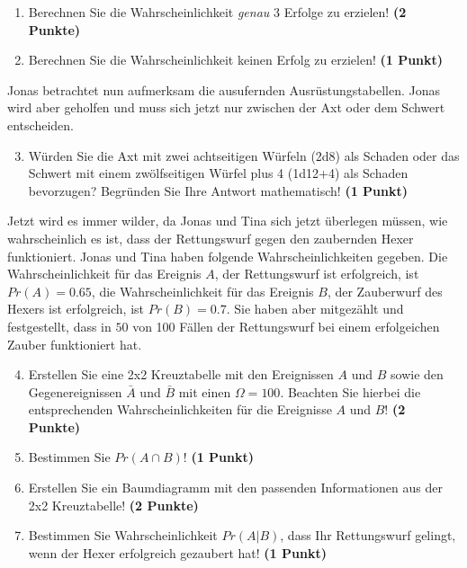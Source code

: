 \documentclass[a4paper, 9pt]{scrartcl}\usepackage[]{graphicx}\usepackage[]{xcolor}
\begin{document}
\begin{enumerate}
\item Berechnen Sie die Wahrscheinlichkeit \textit{genau} 3 Erfolge zu erzielen!  \textbf{(2 Punkte)}
\item Berechnen Sie die Wahrscheinlichkeit keinen Erfolg zu erzielen! \textbf{(1 Punkt)}
\end{enumerate}

Jonas betrachtet nun aufmerksam die ausufernden Ausrüstungstabellen. Jonas wird aber geholfen und muss sich jetzt nur zwischen der Axt oder dem Schwert entscheiden.

\begin{enumerate}
  \setcounter{enumi}{2}
\item Würden Sie die Axt mit zwei achtseitigen Würfeln (2d8) als Schaden oder das Schwert mit einem zwölfseitigen Würfel plus 4 (1d12+4) als Schaden bevorzugen? Begründen Sie Ihre Antwort mathematisch! \textbf{(1 Punkt)}
\end{enumerate}

Jetzt wird es immer wilder, da Jonas und Tina sich jetzt überlegen müssen, wie wahrscheinlich es ist, dass der Rettungswurf gegen den zaubernden Hexer funktioniert. Jonas und Tina haben folgende Wahrscheinlichkeiten gegeben. Die Wahrscheinlichkeit für das Ereignis $A$, der Rettungswurf ist erfolgreich, ist $Pr(A) = 0.65$, die Wahrscheinlichkeit für das Ereignis $B$, der Zauberwurf des Hexers ist erfolgreich, ist $Pr(B) = 0.7$. Sie haben aber mitgezählt und festgestellt, dass in $50$ von 100 Fällen der Rettungswurf bei einem erfolgeichen Zauber funktioniert hat.  

\begin{enumerate}
  \setcounter{enumi}{3}
\item Erstellen Sie eine 2x2 Kreuztabelle mit den Ereignissen $A$ und $B$ sowie den Gegenereignissen $\bar{A}$ und $\bar{B}$ mit einen $\Omega = 100$. Beachten Sie hierbei die entsprechenden Wahrscheinlichkeiten für die Ereignisse $A$ und $B$! \textbf{(2 Punkte)}
\item Bestimmen Sie $Pr(A \cap B)$! \textbf{(1 Punkt)}
\item Erstellen Sie ein Baumdiagramm mit den passenden Informationen aus der 2x2 Kreuztabelle! \textbf{(2 Punkte)}
\item Bestimmen Sie Wahrscheinlichkeit $Pr(A|B)$, dass Ihr Rettungswurf gelingt, wenn der Hexer erfolgreich gezaubert hat! \textbf{(1 Punkt)}
\end{enumerate}

  
\clearpage
\end{document}
